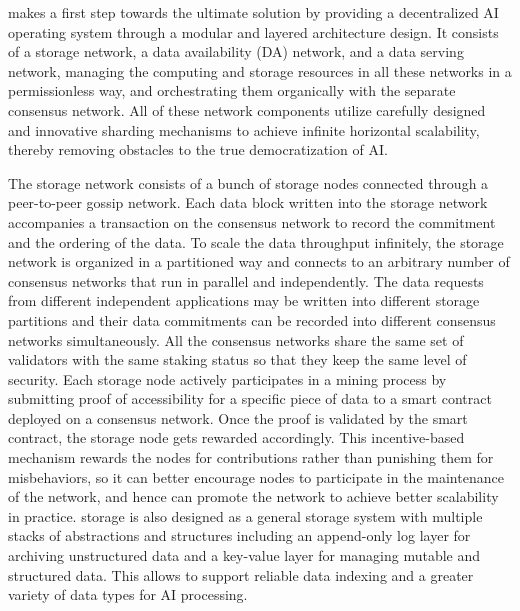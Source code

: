 \project makes a first step towards the ultimate solution by providing a decentralized AI operating system through a modular and layered architecture design. 
It consists of a storage network, a data availability (DA) network, and a data serving network, managing the computing and storage resources in all these networks in a permissionless way, and orchestrating them organically with the separate \project consensus network.
All of these network components utilize carefully designed and innovative sharding mechanisms to achieve infinite horizontal scalability, thereby removing obstacles to the true democratization of AI.

The \project storage network consists of a bunch of storage nodes connected through a peer-to-peer gossip network. 
Each data block written into the storage network accompanies a transaction on the consensus network to record the commitment and the ordering of the data. 
To scale the data throughput infinitely, the storage network is organized in a partitioned way and connects to an arbitrary number of consensus networks that run in parallel and independently. 
The data requests from different independent applications may be written into different storage partitions and their data commitments can be recorded into different consensus networks simultaneously.
All the consensus networks share the same set of validators with the same staking status so that they keep the same level of security.    
Each storage node actively participates in a mining process by submitting proof of accessibility for a specific piece of data to a smart contract deployed on a consensus network. 
Once the proof is validated by the smart contract, the storage node gets rewarded accordingly. 
This incentive-based mechanism rewards the nodes for contributions rather than punishing them for misbehaviors, so it can better encourage nodes to participate in the maintenance of the network, and hence can promote the network to achieve better scalability in practice.
\projabbrev storage is also designed as a general storage system with multiple stacks of abstractions and structures including an append-only log layer for archiving unstructured data and a key-value layer for managing mutable and structured data. 
This allows \projabbrev to support reliable data indexing and a greater variety of data types for AI processing.  

